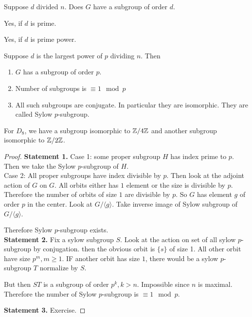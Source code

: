 \begin{question}
	Suppose $d$ divided $n$. Does $G$ have a subgroup of order $d$.
\end{question}
\begin{answer}[Cayley]
	Yes, if $d$ is prime.
\end{answer}
\begin{answer}[Sylow]
	Yes, if $d$ is prime power.
\end{answer}
\begin{theorem}
	Suppose $d$ is the largest power of $p$ dividing $n$. Then \begin{enumerate}
		\item $G$ has a subgroup of order $p$.
		\item Number of subgroups is $\equiv 1 \mod p$
		\item All such subgroups are conjugate. In particular they are isomorphic. They are called Sylow $p$-subgroup.
	\end{enumerate}
\end{theorem}
\begin{example}
	For $D_8$, we have a subgroup isomorphic to $\mathbb Z/ 4 \mathbb Z$ and another subgroup isomorphic to $\mathbb Z/ 2 \mathbb Z$.
\end{example}
\begin{proof}
	
	\textbf{Statement 1.} Case 1: some proper subgroup $H$ has index prime to $p$. Then we take the Sylow $p$-subgroup of $H$. \\
	Case 2: All proper subgroups have index divisible by $p$. Then look at the adjoint action of $G$ on $G$. All orbits either has $1$ element or the size is divisible by $p$. Therefore the number of orbits of size $1$ are divisible by $p$. So $G$ has element $g$ of order $p$ in the center. Look at $G / \langle g \rangle$. Take inverse image of Sylow subgroup of $G / \langle g \rangle$. 

	Therefore Sylow $p$-subgroup exists.\\
	\textbf{Statement 2.} Fix a sylow subgroup $S$. Look at the action on set of all sylow $p$-subgroup by conjugation. then the obvious orbit is $\{s \}$ of size 1. All other orbit have size $p^m, m \geq 1$. IF another orbit has size $1$, there would be a sylow $p$-subgroup $T$ normalize by $S$.

	But then $ST$ is a subgroup of order $p^k, k > n$. Impossible since $n$ is maximal.
	Therefore the number of Sylow $p$-subgroup is $\equiv 1 \mod p$.

	\textbf{Statement 3.} Exercise.
\end{proof}

